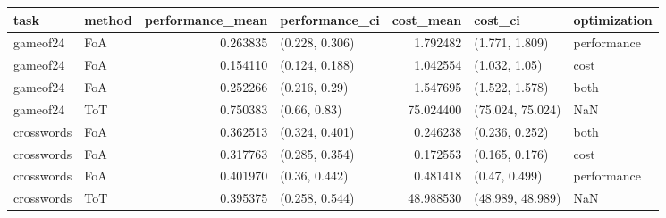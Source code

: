 \begin{tabular}{llrlrll}
\toprule
task & method & performance_mean & performance_ci & cost_mean & cost_ci & optimization \\
\midrule
gameof24 & FoA & 0.263835 & (0.228, 0.306) & 1.792482 & (1.771, 1.809) & performance \\
gameof24 & FoA & 0.154110 & (0.124, 0.188) & 1.042554 & (1.032, 1.05) & cost \\
gameof24 & FoA & 0.252266 & (0.216, 0.29) & 1.547695 & (1.522, 1.578) & both \\
gameof24 & ToT & 0.750383 & (0.66, 0.83) & 75.024400 & (75.024, 75.024) & NaN \\
crosswords & FoA & 0.362513 & (0.324, 0.401) & 0.246238 & (0.236, 0.252) & both \\
crosswords & FoA & 0.317763 & (0.285, 0.354) & 0.172553 & (0.165, 0.176) & cost \\
crosswords & FoA & 0.401970 & (0.36, 0.442) & 0.481418 & (0.47, 0.499) & performance \\
crosswords & ToT & 0.395375 & (0.258, 0.544) & 48.988530 & (48.989, 48.989) & NaN \\
\bottomrule
\end{tabular}
